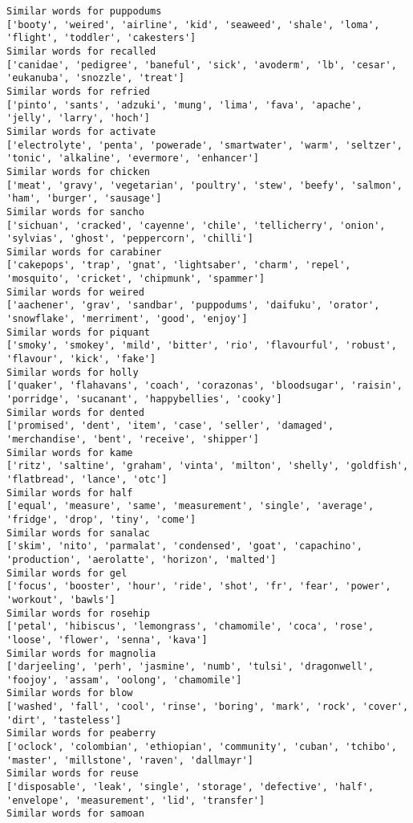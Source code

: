 \documentclass[11pt]{article}
\begin{document}
\begin{Verbatim}[commandchars=\\\{\}]
Similar words for puppodums
['booty', 'weired', 'airline', 'kid', 'seaweed', 'shale', 'loma', 'flight', 'toddler', 'cakesters']
Similar words for recalled
['canidae', 'pedigree', 'baneful', 'sick', 'avoderm', 'lb', 'cesar', 'eukanuba', 'snozzle', 'treat']
Similar words for refried
['pinto', 'sants', 'adzuki', 'mung', 'lima', 'fava', 'apache', 'jelly', 'larry', 'hoch']
Similar words for activate
['electrolyte', 'penta', 'powerade', 'smartwater', 'warm', 'seltzer', 'tonic', 'alkaline', 'evermore', 'enhancer']
Similar words for chicken
['meat', 'gravy', 'vegetarian', 'poultry', 'stew', 'beefy', 'salmon', 'ham', 'burger', 'sausage']
Similar words for sancho
['sichuan', 'cracked', 'cayenne', 'chile', 'tellicherry', 'onion', 'sylvias', 'ghost', 'peppercorn', 'chilli']
Similar words for carabiner
['cakepops', 'trap', 'gnat', 'lightsaber', 'charm', 'repel', 'mosquito', 'cricket', 'chipmunk', 'spammer']
Similar words for weired
['aachener', 'grav', 'sandbar', 'puppodums', 'daifuku', 'orator', 'snowflake', 'merriment', 'good', 'enjoy']
Similar words for piquant
['smoky', 'smokey', 'mild', 'bitter', 'rio', 'flavourful', 'robust', 'flavour', 'kick', 'fake']
Similar words for holly
['quaker', 'flahavans', 'coach', 'corazonas', 'bloodsugar', 'raisin', 'porridge', 'sucanant', 'happybellies', 'cooky']
Similar words for dented
['promised', 'dent', 'item', 'case', 'seller', 'damaged', 'merchandise', 'bent', 'receive', 'shipper']
Similar words for kame
['ritz', 'saltine', 'graham', 'vinta', 'milton', 'shelly', 'goldfish', 'flatbread', 'lance', 'otc']
Similar words for half
['equal', 'measure', 'same', 'measurement', 'single', 'average', 'fridge', 'drop', 'tiny', 'come']
Similar words for sanalac
['skim', 'nito', 'parmalat', 'condensed', 'goat', 'capachino', 'production', 'aerolatte', 'horizon', 'malted']
Similar words for gel
['focus', 'booster', 'hour', 'ride', 'shot', 'fr', 'fear', 'power', 'workout', 'bawls']
Similar words for rosehip
['petal', 'hibiscus', 'lemongrass', 'chamomile', 'coca', 'rose', 'loose', 'flower', 'senna', 'kava']
Similar words for magnolia
['darjeeling', 'perh', 'jasmine', 'numb', 'tulsi', 'dragonwell', 'foojoy', 'assam', 'oolong', 'chamomile']
Similar words for blow
['washed', 'fall', 'cool', 'rinse', 'boring', 'mark', 'rock', 'cover', 'dirt', 'tasteless']
Similar words for peaberry
['oclock', 'colombian', 'ethiopian', 'community', 'cuban', 'tchibo', 'master', 'millstone', 'raven', 'dallmayr']
Similar words for reuse
['disposable', 'leak', 'single', 'storage', 'defective', 'half', 'envelope', 'measurement', 'lid', 'transfer']
Similar words for samoan

\end{Verbatim}
\end{document}

